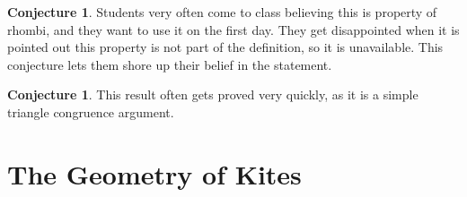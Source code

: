 \documentclass{tufte-handout}
\theoremstyle{definition}
\newtheorem{conjecture}[problem]{Conjecture}
\begin{document}
\begin{conjecture}
Students very often come to class believing this is property of rhombi, and they want to use it on the first day.
They get disappointed when it is pointed out this property is not part of the definition, so it is unavailable.
This conjecture lets them shore up their belief in the statement.
\end{conjecture}

\begin{conjecture}
This result often gets proved very quickly, as it is a simple triangle congruence argument.
\end{conjecture}

\clearpage
\section{The Geometry of Kites}
\end{document}
